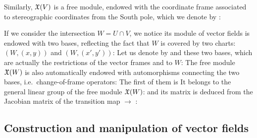 Similarly, $\mathfrak{X}(V)$ is a free module, endowed with the coordinate frame
associated to stereographic coordinates from the South pole, which we
denote by :

If we consider the intersection $W=U\cap V$, we notice its module
of vector fields is endowed with two bases, reflecting the fact that
$W$ is covered by two charts: $(W,(x,y))$ and $(W,(x',y'))$:
Let us denote by  and  these two bases, which are
actually the restrictions of the vector frames  and  to
$W$:
The free module $\mathfrak{X}(W)$ is also automatically endowed with automorphisms
connecting the two bases, i.e.\ change-of-frame operators:
The first of them is
It belongs to the general linear group of the free module $\mathfrak{X}(W)$:
and its matrix is deduced from the Jacobian matrix of the transition map
 $\to$ :

\subsection{Construction and manipulation of vector fields}

